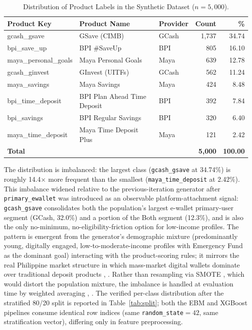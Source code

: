 \documentclass[journal]{./IEEE/IEEEtran}
\begin{document}
\begin{table}[h]
    \centering
    \caption{Distribution of Product Labels in the Synthetic Dataset ($n = 5{,}000$).}
    \label{tab:class-dist}
    \footnotesize
    \begin{tabular}{|l|p{2cm}|l|r|r|}
        \hline
        \textbf{Product Key} & \textbf{Product Name} & \textbf{Provider} & \textbf{Count} & \textbf{\%} \\
        \hline
        gcash\_gsave & GSave (CIMB) & GCash & 1{,}737 & 34.74 \\
        bpi\_save\_up & BPI \#SaveUp & BPI & 805 & 16.10 \\
        maya\_personal\_goals & Maya Personal Goals & Maya & 639 & 12.78 \\
        gcash\_ginvest & GInvest (UITFs) & GCash & 562 & 11.24 \\
        maya\_savings & Maya Savings & Maya & 424 & 8.48 \\
        bpi\_time\_deposit & BPI Plan Ahead Time Deposit & BPI & 392 & 7.84 \\
        bpi\_savings & BPI Regular Savings & BPI & 320 & 6.40 \\
        maya\_time\_deposit & Maya Time Deposit Plus & Maya & 121 & 2.42 \\
        \hline
        \textbf{Total} & & & \textbf{5{,}000} & \textbf{100.00} \\
        \hline
    \end{tabular}
\end{table}

The distribution is imbalanced: the largest class (\texttt{gcash\_gsave} at 34.74\%) is roughly 14.4$\times$ more frequent than the smallest (\texttt{maya\_time\_deposit} at 2.42\%). This imbalance widened relative to the previous-iteration generator after \texttt{primary\_ewallet} was introduced as an observable platform-attachment signal: \texttt{gcash\_gsave} consolidates both the population's largest e-wallet primary-user segment (GCash, 32.0\%) and a portion of the Both segment (12.3\%), and is also the only no-minimum, no-eligibility-friction option for low-income profiles. The pattern is emergent from the generator's demographic mixture (predominantly young, digitally engaged, low-to-moderate-income profiles with Emergency Fund as the dominant goal) interacting with the product-scoring rules; it mirrors the real Philippine market structure in which mass-market digital wallets dominate over traditional deposit products \cite{ref35}, \cite{ref42}. Rather than resampling via SMOTE \cite{ref47}, which would distort the population mixture, the imbalance is handled at evaluation time by weighted averaging \cite{ref58}, \cite{ref78}. The verified per-class distribution after the stratified 80/20 split \cite{ref59} is reported in Table~\ref{tab:split}; both the EBM and XGBoost pipelines consume identical row indices (same \texttt{random\_state}$=42$, same stratification vector), differing only in feature preprocessing.
\end{document}
